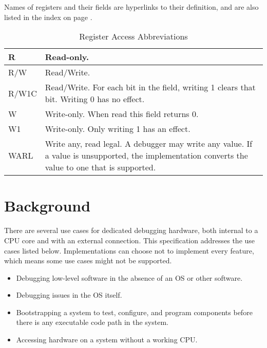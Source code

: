 Names of registers and their fields are hyperlinks to their definition, and are
also listed in the index on page \pageref{index}.



\begin{table}[htp]
    \centering
    \caption{Register Access Abbreviations}
    \label{tab:access}
    \begin{tabulary}{\textwidth}{|l|L|}
        \hline
        R & Read-only. \\
        \hline
        R/W & Read/Write. \\
        \hline
        R/W1C & Read/Write. For each bit in the field, writing 1 clears that bit. Writing 0 has no effect. \\
        \hline
        W & Write-only. When read this field returns 0. \\
        \hline
        W1 & Write-only. Only writing 1 has an effect. \\
        \hline
        WARL & Write any, read legal. A debugger may write any value. If a
        value is unsupported, the implementation converts the value to one that
        is supported. \\
        \hline
    \end{tabulary}
\end{table}

%

\section{Background}

There are several use cases for dedicated debugging hardware, both
internal to a CPU core and with an external connection.
This specification addresses the use cases listed below. Implementations
can choose not to implement every feature, which means some use cases might
not be supported.

\begin{itemize}

\item Debugging low-level software in the absence of an OS or other software.

\item Debugging issues in the OS itself.

\item Bootstrapping a system to test, configure, and program components before
  there is any executable code path in the system.

\item Accessing hardware on a system without a working CPU.

\end{itemize}

